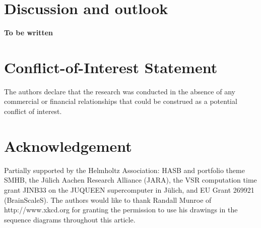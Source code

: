 \documentclass{frontiersSCNS} %
\newcommand{\tbw}[1]{{\bf\parindent0pt\color{red}#1}}
\begin{document}

\section{Discussion and outlook}
\tbw{To be written}



\section*{Conflict-of-Interest Statement}
The authors declare that the research was conducted in the absence of
any commercial or financial relationships that could be construed as a
potential conflict of interest.

\section*{Acknowledgement}
Partially supported by the Helmholtz Association: HASB and portfolio
theme SMHB, the Jülich Aachen Research Alliance (JARA), the VSR
computation time grant JINB33 on the JUQUEEN supercomputer in Jülich,
and EU Grant 269921 (BrainScaleS). The authors would like to thank
Randall Munroe of http://www.xkcd.org for granting the permission to
use his drawings in the sequence diagrams throughout this article.




\end{document}
